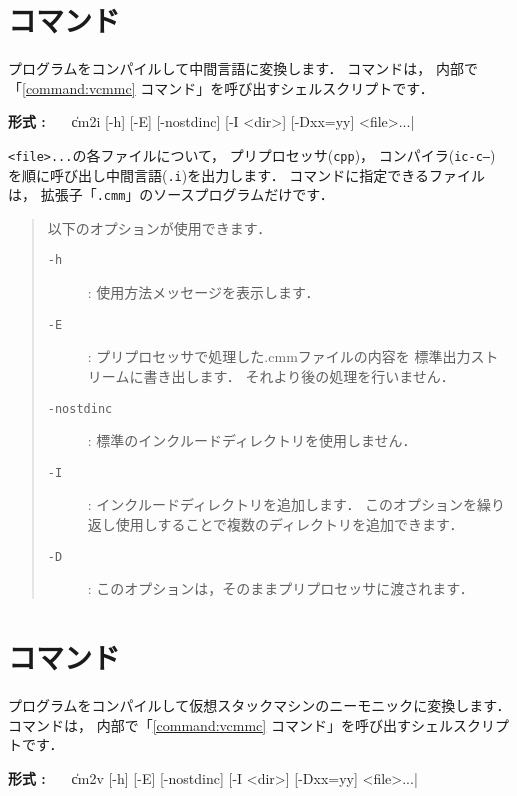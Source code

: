 \section{{\cmi}コマンド}

{\cmm}プログラムをコンパイルして中間言語に変換します．
{\cmi}コマンドは，
内部で「\ref{command:vcmmc} {\icmmc}コマンド」を呼び出すシェルスクリプトです．

\begin{flushleft}
{\bf 形式 : }~~~\|cm2i [-h] [-E] [-nostdinc] [-I <dir>] [-Dxx=yy] <file>...|
\end{flushleft}

{\tt <file>...}の各ファイルについて，
プリプロセッサ({\tt cpp})，
コンパイラ({\tt ic-c--})
を順に呼び出し中間言語({\tt .i})を出力します．
{\cmi}コマンドに指定できるファイルは，
拡張子「{\tt .cmm}」の{\cmml}ソースプログラムだけです．

\begin{quote}
\hspace{-1em}以下のオプションが使用できます．

\begin{description}
\item[{\tt -h}] : 使用方法メッセージを表示します．
\item[{\tt -E}] : プリプロセッサで処理した{.cmm}ファイルの内容を
標準出力ストリームに書き出します．
それより後の処理を行いません．
\item[{\tt -nostdinc}] : 標準のインクルードディレクトリを使用しません．
\item[{\tt -I}] : インクルードディレクトリを追加します．
このオプションを繰り返し使用しすることで複数のディレクトリを追加できます．
\item[{\tt -D}] : このオプションは，そのままプリプロセッサに渡されます．
\end{description}
\end{quote}

\section{{\cmv}コマンド}

{\cmm}プログラムをコンパイルして仮想スタックマシンのニーモニックに変換します．
{\cmv}コマンドは，
内部で「\ref{command:vcmmc} {\vcmmc}コマンド」を呼び出すシェルスクリプトです．

\begin{flushleft}
{\bf 形式 : }~~~\|cm2v [-h] [-E] [-nostdinc] [-I <dir>] [-Dxx=yy] <file>...|
\end{flushleft}

